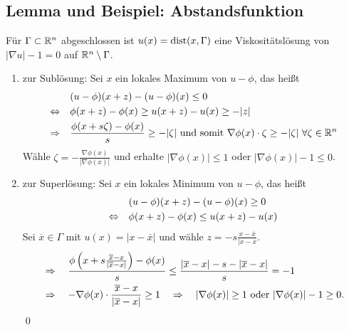 \subsection{Lemma und Beispiel: Abstandsfunktion}
\label{lemma_23}
	Für $\Gamma \subset \mathbb{R}^n$ abgeschlossen ist $u(x) = \operatorname{dist}(x,\Gamma)$ eine Viskositätslösung von $|\nabla u| - 1 = 0$ auf $\mathbb{R}^n \setminus \Gamma$. \marginnote{[23]}
	
	\begin{enumerate}
		\item zur Sublösung: Sei $x$ ein lokales Maximum von $u - \phi$, das heißt
		\begin{equation}
		\begin{aligned}
			&(u-\phi)(x+z)-(u-\phi)(x) \leq 0 \\ \notag
			\Leftrightarrow \quad &\phi(x+z) - \phi(x) \geq u(x+z) - u(x) \geq -|z| \\
			\Rightarrow \quad &\frac{\phi(x+s\zeta) - \phi(x)}{s} \geq -|\zeta| \text{ und somit } \nabla\phi(x) \cdot \zeta \geq -|\zeta| \ \forall \zeta \in \mathbb{R}^n 
		\end{aligned}
		\end{equation}
		Wähle $\zeta = - \frac{\nabla \phi(x)}{|\nabla \phi(x)|}$ und erhalte $|\nabla \phi(x)| \leq 1$ oder $|\nabla \phi(x)| - 1 \leq 0$.
		\item zur Superlösung:  Sei $x$ ein lokales Minimum von $u - \phi$, das heißt
		\begin{equation}
		\begin{aligned}
			&(u-\phi)(x+z)-(u-\phi)(x) \geq 0 \\ \notag
			\Leftrightarrow \quad &\phi(x+z) - \phi(x) \leq u(x+z) - u(x) \\
		\end{aligned}
		\end{equation}
		Sei $\overline{x} \in \Gamma$ mit $u(x) = |x-\overline{x}|$ und wähle $z = -s \frac{x-\overline{x}}{|x-\overline{x}}$.
		\begin{equation}
		\begin{aligned}
			&\Rightarrow \quad \frac{ \phi \left(x+s\frac{\overline{x}-x}{|\overline{x}-x|} \right) - \phi(x)}{s} \leq \frac{|\overline{x} - x| - s - |\overline{x}-x|}{s} = -1 \\ \notag
			&\Rightarrow \quad -\nabla \phi(x) \cdot \frac{\overline{x}-x}{|\overline{x}-x|} \geq 1
			\quad \Rightarrow \quad |\nabla\phi(x)| \geq 1 \text{ oder } |\nabla \phi(x)|-1 \geq 0. 
		\end{aligned}
		\end{equation}
		\qed
	\end{enumerate}
	
